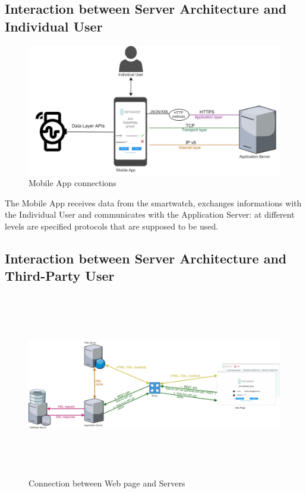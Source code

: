 \subsection{Interaction between Server Architecture and Individual User}
\begin{figure}[H]
\caption{Mobile App connections}
\includegraphics[width = \textwidth]{sections/architecturalDesign/overview_individual_user.jpg}
\end{figure}

The Mobile App receives data from the smartwatch, exchanges informations with the Individual User and communicates with the Application Server: at different levels are specified protocols that are supposed to be used. 
 

\subsection{Interaction between Server Architecture and Third-Party User}
\begin{figure}[H]
\caption{Connection between Web page and Servers}
\includegraphics[width = \textwidth ,  height=8cm]{sections/architecturalDesign/overview_web.jpg}
\end{figure}

